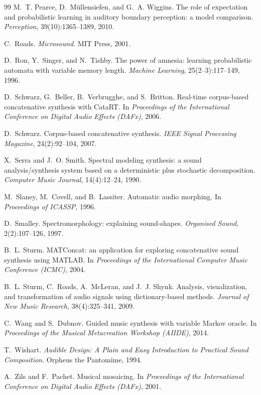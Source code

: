 \documentclass[11pt,a4paper]{article}
\begin{document}
\begin{thebibliography}{99}
M.~T. Pearce, D.~M\"ullensiefen, and G.~A. Wiggins.
\newblock The role of expectation and probabilistic learning in auditory
  boundary perception: a model comparison.
\newblock \emph{Perception}, 39(10):1365--1389, 2010.

C.~Roads.
\newblock \emph{Microsound}.
\newblock MIT Press, 2001.

D.~Ron, Y.~Singer, and N.~Tishby.
\newblock The power of amnesia: learning probabilistic automata with variable
  memory length.
\newblock \emph{Machine Learning}, 25(2--3):117--149, 1996.

D.~Schwarz, G.~Beller, B.~Verbrugghe, and S.~Britton.
\newblock Real-time corpus-based concatenative synthesis with CataRT.
\newblock In \emph{Proceedings of the International Conference on Digital
  Audio Effects (DAFx)}, 2006.

D.~Schwarz.
\newblock Corpus-based concatenative synthesis.
\newblock \emph{IEEE Signal Processing Magazine}, 24(2):92--104, 2007.

X.~Serra and J.~O. Smith.
\newblock Spectral modeling synthesis: a sound analysis/synthesis system
  based on a deterministic plus stochastic decomposition.
\newblock \emph{Computer Music Journal}, 14(4):12--24, 1990.

M.~Slaney, M.~Covell, and B.~Lassiter.
\newblock Automatic audio morphing.
\newblock In \emph{Proceedings of ICASSP}, 1996.

D.~Smalley.
\newblock Spectromorphology: explaining sound-shapes.
\newblock \emph{Organised Sound}, 2(2):107--126, 1997.

B.~L. Sturm.
\newblock MATConcat: an application for exploring concatenative sound
  synthesis using MATLAB.
\newblock In \emph{Proceedings of the International Computer Music
  Conference (ICMC)}, 2004.

B.~L. Sturm, C.~Roads, A.~McLeran, and J.~J. Shynk.
\newblock Analysis, visualization, and transformation of audio signals using
  dictionary-based methods.
\newblock \emph{Journal of New Music Research}, 38(4):325--341, 2009.

C.~Wang and S.~Dubnov.
\newblock Guided music synthesis with variable Markov oracle.
\newblock In \emph{Proceedings of the Musical Metacreation Workshop (AIIDE)},
  2014.

T.~Wishart.
\newblock \emph{Audible Design: A Plain and Easy Introduction to Practical
  Sound Composition}.
\newblock Orpheus the Pantomime, 1994.

A.~Zils and F.~Pachet.
\newblock Musical mosaicing.
\newblock In \emph{Proceedings of the International Conference on Digital
  Audio Effects (DAFx)}, 2001.

\end{thebibliography}
\end{document}
